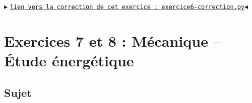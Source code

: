 \documentclass[11pt]{article}
\begin{document}
\begin{center}
$\blacktriangleright$ \href{https://github.com/formationPythonPC-Juin/corrections-formation/blob/master/exercice6-correction.py}{\underline{\texttt{lien vers la correction de cet exercice : exercice6-correction.py}}}$\blacktriangleleft$                                                                                                                                                                    \end{center}
























\newpage


\section{Exercices 7 et 8 : Mécanique -- Étude énergétique}







\bigskip














\subsection{Sujet}
\end{document}
